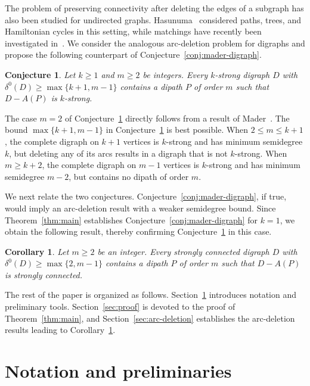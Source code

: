 \documentclass[12pt]{article}
\numberwithin{equation}{section}
\theoremstyle{plain}
\newtheorem{corollary}[theorem]{Corollary}
\newtheorem{conjecture}[theorem]{Conjecture}
\theoremstyle{definition}
\begin{document}
The problem of preserving connectivity after deleting the edges of a subgraph has also been studied for undirected graphs.
Hasunuma~\cite{Hasunuma23,Hasunuma25} considered paths, trees, and Hamiltonian cycles in this setting, while matchings have recently been investigated in~\cite{CKP26,Chu26}.
We consider the analogous arc-deletion problem for digraphs and propose the following counterpart of Conjecture~\ref{conj:mader-digraph}.

\begin{conjecture}\label{conj:arc-deletion}
Let $k\ge1$ and $m\ge2$ be integers.
Every $k$-strong digraph $D$ with $\delta^0(D)\ge\max\{k+1,m-1\}$ contains a dipath $P$ of order $m$ such that $D-A(P)$ is $k$-strong.
\end{conjecture}

The case $m=2$ of Conjecture~\ref{conj:arc-deletion} directly follows from a result of Mader~\cite{Mader85}.
The bound $\max\{k+1,m-1\}$ in Conjecture~\ref{conj:arc-deletion} is best possible.
When $2\le m\le k+1$, the complete digraph on $k+1$ vertices is $k$-strong and has minimum semidegree $k$, but deleting any of its arcs results in a digraph that is not $k$-strong.
When $m\ge k+2$, the complete digraph on $m-1$ vertices is $k$-strong and has minimum semidegree $m-2$, but contains no dipath of order $m$.

We next relate the two conjectures.
Conjecture~\ref{conj:mader-digraph}, if true, would imply an arc-deletion result with a weaker semidegree bound.
Since Theorem~\ref{thm:main} establishes Conjecture~\ref{conj:mader-digraph} for $k=1$, we obtain the following result, thereby confirming Conjecture~\ref{conj:arc-deletion} in this case.

\begin{corollary}\label{cor:arc-deletion}
Let $m\ge2$ be an integer.
Every strongly connected digraph $D$ with $\delta^0(D)\ge\max\{2,m-1\}$ contains a dipath $P$ of order $m$ such that $D-A(P)$ is strongly connected.
\end{corollary}

The rest of the paper is organized as follows.
Section~\ref{sec:preliminaries} introduces notation and preliminary tools.
Section~\ref{sec:proof} is devoted to the proof of Theorem~\ref{thm:main}, and Section~\ref{sec:arc-deletion} establishes the arc-deletion results leading to Corollary~\ref{cor:arc-deletion}.

\section{Notation and preliminaries}\label{sec:preliminaries}
\end{document}
